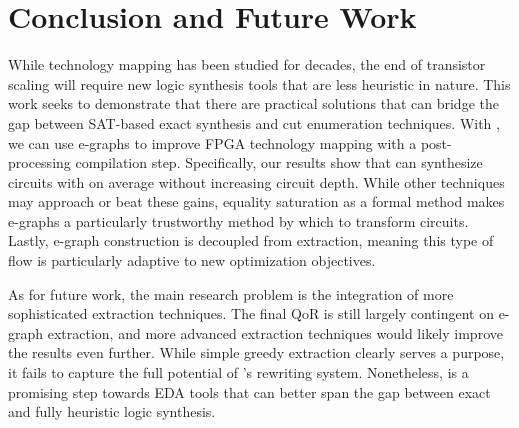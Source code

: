 \section{Conclusion and Future Work}\label{sec:conclusion}
While technology mapping has been studied for decades, the end of transistor
scaling will require new logic synthesis tools that are less heuristic in
nature. This work seeks to demonstrate that there are practical solutions that
can bridge the gap between SAT-based exact synthesis and cut enumeration
techniques. With \shortname{}, we can use e-graphs to improve FPGA technology
mapping with a post-processing compilation step. Specifically, our results show
that \shortname{} can synthesize circuits with \metric{} on average without
increasing circuit depth. While other techniques may approach or beat these
gains, equality saturation as a formal method makes e-graphs a particularly
trustworthy method by which to transform circuits. Lastly, e-graph construction
is decoupled from extraction, meaning this type of flow is particularly
adaptive to new optimization objectives.

As for future work, the main research problem is the integration of more
sophisticated extraction techniques. The final QoR is still largely contingent
on e-graph extraction, and more advanced extraction techniques would likely
improve the results even further. While simple greedy extraction clearly serves
a purpose, it fails to capture the full potential of \shortname{}'s rewriting
system. Nonetheless, \shortname{} is a promising step towards EDA tools that
can better span the gap between exact and fully heuristic logic synthesis.
